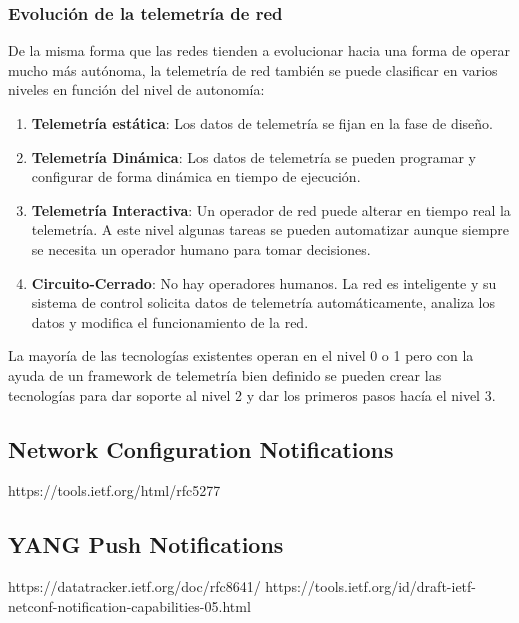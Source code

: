 \subsubsection{Evolución de la telemetría de red}
De la misma forma que las redes tienden a evolucionar hacia una forma de operar mucho más autónoma, la telemetría de red también se puede clasificar en varios niveles en función del nivel de autonomía:
\begin{enumerate}[label=Nivel \arabic*, leftmargin=4\parindent]
    \setcounter{enumi}{0}
    \item \textbf{Telemetría estática}: Los datos de telemetría se fijan en la fase de diseño.
    \item \textbf{Telemetría Dinámica}: Los datos de telemetría se pueden programar y configurar de forma dinámica en tiempo de ejecución.
    \item \textbf{Telemetría Interactiva}: Un operador de red puede alterar en tiempo real la telemetría. A este nivel algunas tareas se pueden automatizar aunque siempre se necesita un operador humano para tomar decisiones.
    \item \textbf{Circuito-Cerrado}: No hay operadores humanos. La red es inteligente y su sistema de control solicita datos de telemetría automáticamente, analiza los datos y modifica el funcionamiento de la red.
\end{enumerate}

La mayoría de las tecnologías existentes operan en el nivel 0 o 1 pero con la ayuda de un framework de telemetría bien definido se pueden crear las tecnologías para dar soporte al nivel 2 y dar los primeros pasos hacía el nivel 3.



\subsection{Network Configuration Notifications\label{sec:NETCONFNot}}

https://tools.ietf.org/html/rfc5277

\subsection{YANG Push Notifications\label{sec:YANGNot}}

https://datatracker.ietf.org/doc/rfc8641/
https://tools.ietf.org/id/draft-ietf-netconf-notification-capabilities-05.html